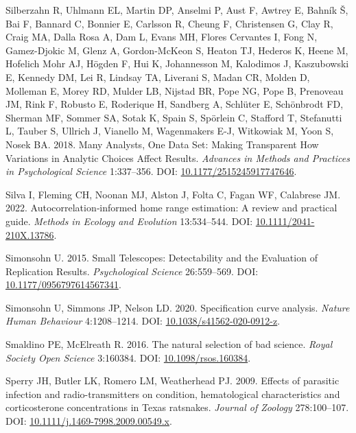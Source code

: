 \documentclass[10pt,a4paper]{article}
\newlength{\cslhangindent}
\newenvironment{CSLReferences}[2] %
 {\begin{list}{}{%
  \setlength{\itemindent}{0pt}
  \setlength{\leftmargin}{0pt}
  \setlength{\parsep}{0pt}
  \ifodd #1
   \setlength{\leftmargin}{\cslhangindent}
   \setlength{\itemindent}{-1\cslhangindent}
  \fi
  \setlength{\itemsep}{#2\baselineskip}}}
 {\end{list}}
\begin{document}
\begin{CSLReferences}{1}{0}
Silberzahn R, Uhlmann EL, Martin DP, Anselmi P, Aust F, Awtrey E, Bahník Š, Bai F, Bannard C, Bonnier E, Carlsson R, Cheung F, Christensen G, Clay R, Craig MA, Dalla Rosa A, Dam L, Evans MH, Flores Cervantes I, Fong N, Gamez-Djokic M, Glenz A, Gordon-McKeon S, Heaton TJ, Hederos K, Heene M, Hofelich Mohr AJ, Högden F, Hui K, Johannesson M, Kalodimos J, Kaszubowski E, Kennedy DM, Lei R, Lindsay TA, Liverani S, Madan CR, Molden D, Molleman E, Morey RD, Mulder LB, Nijstad BR, Pope NG, Pope B, Prenoveau JM, Rink F, Robusto E, Roderique H, Sandberg A, Schlüter E, Schönbrodt FD, Sherman MF, Sommer SA, Sotak K, Spain S, Spörlein C, Stafford T, Stefanutti L, Tauber S, Ullrich J, Vianello M, Wagenmakers E-J, Witkowiak M, Yoon S, Nosek BA. 2018. Many {Analysts}, {One} {Data} {Set}: {Making} {Transparent} {How} {Variations} in {Analytic} {Choices} {Affect} {Results}. \emph{Advances in Methods and Practices in Psychological Science} 1:337--356. DOI: \href{https://doi.org/10.1177/2515245917747646}{10.1177/2515245917747646}.

Silva I, Fleming CH, Noonan MJ, Alston J, Folta C, Fagan WF, Calabrese JM. 2022. Autocorrelation‐informed home range estimation: {A} review and practical guide. \emph{Methods in Ecology and Evolution} 13:534--544. DOI: \href{https://doi.org/10.1111/2041-210X.13786}{10.1111/2041-210X.13786}.

Simonsohn U. 2015. Small {Telescopes}: {Detectability} and the {Evaluation} of {Replication} {Results}. \emph{Psychological Science} 26:559--569. DOI: \href{https://doi.org/10.1177/0956797614567341}{10.1177/0956797614567341}.

Simonsohn U, Simmons JP, Nelson LD. 2020. Specification curve analysis. \emph{Nature Human Behaviour} 4:1208--1214. DOI: \href{https://doi.org/10.1038/s41562-020-0912-z}{10.1038/s41562-020-0912-z}.

Smaldino PE, McElreath R. 2016. The natural selection of bad science. \emph{Royal Society Open Science} 3:160384. DOI: \href{https://doi.org/10.1098/rsos.160384}{10.1098/rsos.160384}.

Sperry JH, Butler LK, Romero LM, Weatherhead PJ. 2009. Effects of parasitic infection and radio-transmitters on condition, hematological characteristics and corticosterone concentrations in {Texas} ratsnakes. \emph{Journal of Zoology} 278:100--107. DOI: \href{https://doi.org/10.1111/j.1469-7998.2009.00549.x}{10.1111/j.1469-7998.2009.00549.x}.


\end{CSLReferences}
\end{document}
